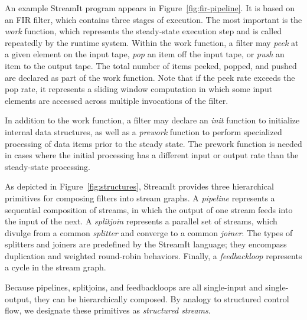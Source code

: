 An example StreamIt program appears in Figure~\ref{fig:fir-pipeline}.
It is based on an FIR filter, which contains three stages of
execution.  The most important is the {\it work} function, which
represents the steady-state execution step and is called repeatedly by
the runtime system.  Within the work function, a filter may {\it peek}
at a given element on the input tape, {\it pop} an item off the input
tape, or {\it push} an item to the output tape.  The total number of
items peeked, popped, and pushed are declared as part of the work
function.  Note that if the peek rate exceeds the pop rate, it
represents a sliding window computation in which some input elements
are accessed across multiple invocations of the filter.

In addition to the work function, a filter may declare an {\it init}
function to initialize internal data structures, as well as a {\it
  prework} function to perform specialized processing of data items
prior to the steady state.  The prework function is needed in cases
where the initial processing has a different input or output rate than
the steady-state processing.

As depicted in Figure~\ref{fig:structures}, StreamIt provides three
hierarchical primitives for composing filters into stream graphs.  A
{\it pipeline} represents a sequential composition of streams, in
which the output of one stream feeds into the input of the next.  A
{\it splitjoin} represents a parallel set of streams, which divulge
from a common {\it splitter} and converge to a common {\it joiner}.
The types of splitters and joiners are predefined by the StreamIt
language; they encompass duplication and weighted round-robin
behaviors.  Finally, a {\it feedbackloop} represents a cycle in the
stream graph.

\enlargethispage*{12pt}

Because pipelines, splitjoins, and feedbackloops are all single-input
and single-output, they can be hierarchically composed.  By analogy to
structured control flow, we designate these primitives as {\it
  structured streams}.

